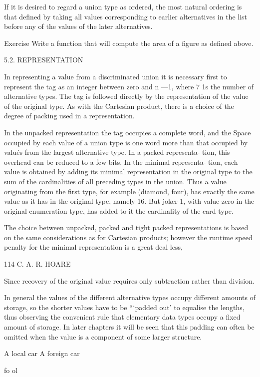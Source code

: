 {	If it is desired to regard a union type as ordered, the most natural ordering is that defined by taking all values corresponding to earlier alternatives in the list before any of the values of the later alternatives.
	
	Exercise Write a function that will compute the area of a figure as defined above.
	
	5.2. REPRESENTATION
	
	In representing a value from a discriminated union it is necessary first to represent the tag as an integer between zero and n —1, where 7 1s the number of alternative types. The tag is followed directly by the representation of the value of the original type. As with the Cartesian product, there is a choice of the degree of packing used in a representation.
	
	In the unpacked representation the tag occupies a complete word, and the Space occupied by each value of a union type is one word more than that occupied by valués from the largest alternative type. In a packed representa- tion, this overhead can be reduced to a few bits. In the minimal representa- tion, each value is obtained by adding its minimal representation in the original type to the sum of the cardinalities of all preceding types in the union. Thus a value originating from the first type, for example (diamond, four), has exactly the same value as it has in the original type, namely 16. But joker 1, with value zero in the original enumeration type, has added to it the cardinality of the card type.
	
	The choice between unpacked, packed and tight packed representations is based on the same considerations as for Cartesian products; however the runtime speed penalty for the minimal representation is a great deal less,
	
	114 C. A. R. HOARE
	
	Since recovery of the original value requires only subtraction rather than division.
	
	In general the values of the different alternative types occupy different amounts of storage, so the shorter values have to be “‘padded out’ to equalise the lengths, thus observing the convenient rule that elementary data types occupy a fixed amount of storage. In later chapters it will be seen that this padding can often be omitted when the value is a component of some larger structure.
	
	A local car A foreign car
	
	fo ol
	
}

